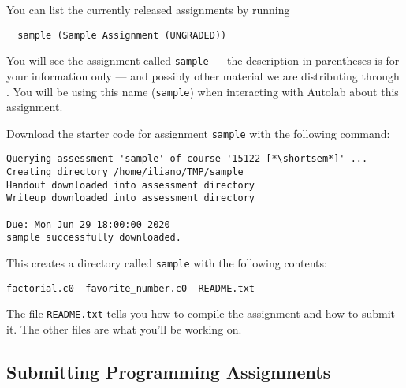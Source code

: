 \begin{part}
  You can list the currently released assignments by running
\begin{lstlisting}[language={[coin]C}]
% autolab122 hw
  sample (Sample Assignment (UNGRADED))
\end{lstlisting}\vspace{-1.5ex}
You will see the assignment called \lstinline'sample' --- the
description in parentheses is for your information only --- and
possibly other material we are distributing through \autolab{}.  You
will be using this name (\lstinline'sample') when interacting with
Autolab about this assignment.
\end{part}


\begin{part}
  Download the starter code for assignment \lstinline'sample' with
  the following command:
\begin{lstlisting}[language={[coin]C}]
% autolab122 download sample
Querying assessment 'sample' of course '15122-[*\shortsem*]' ...
Creating directory /home/iliano/TMP/sample
Handout downloaded into assessment directory
Writeup downloaded into assessment directory

Due: Mon Jun 29 18:00:00 2020
sample successfully downloaded.
\end{lstlisting}\vspace{-1.5ex}
This creates a directory called \lstinline'sample' with the following
contents:
\begin{lstlisting}[language={[coin]C}]
% ls sample
factorial.c0  favorite_number.c0  README.txt
\end{lstlisting}\vspace{-1.5ex}
The file \lstinline'README.txt' tells you how to compile the
assignment and how to submit it.  The other files are what you'll be
working on.
\end{part}








\subsection*{Submitting Programming Assignments}

